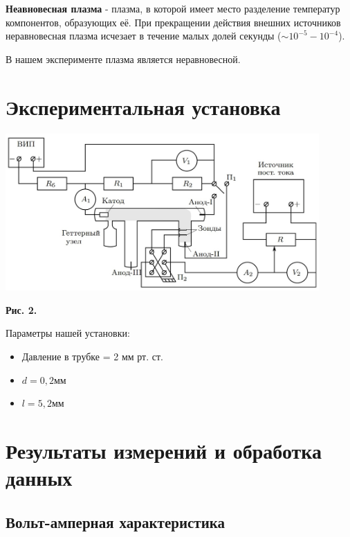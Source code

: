 \documentclass [a4paper, 12pt]{article}
\begin{document}
    \textbf{Неавновесная плазма} - плазма, в которой имеет место разделение температур компонентов, образующих её. При прекращении действия внешних источников неравновесная плазма исчезает в течение малых долей секунды ($\sim 10^{-5} - 10^{-4}$).


    В нашем эксперименте плазма является неравновесной.






\section{Экспериментальная установка}


\begin{center}
\includegraphics[width=12cm, height=6cm]{sheme_351.jpg}
\end{center}
\begin{flushright}
{\small \textbf{Рис. 2.} }
\end{flushright}

    Параметры нашей установки:

\begin{itemize}
    \item Давление в трубке = 2 мм рт. ст.
    \item $d = 0,2 мм$
    \item $l = 5,2 мм$
\end{itemize}




    
\section{Результаты измерений и обработка данных}

\subsection{Вольт-амперная характеристика}
\end{document}
